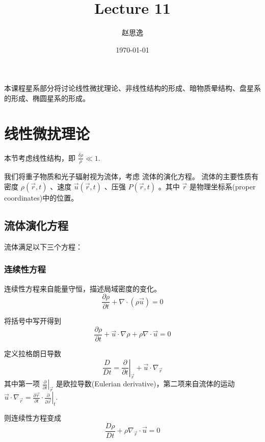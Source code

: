 \documentclass[12pt]{ctexart}
\title{Lecture 11}
\author{赵思逸}
\date{\today}
\begin{document}
\maketitle

本课程星系部分将讨论线性微扰理论、非线性结构的形成、暗物质晕结构、盘星系的形成、椭圆星系的形成。

\section{线性微扰理论}

本节考虑线性结构，即 $\frac{\delta \rho}{\rho} \ll 1$.

我们将重子物质和光子辐射视为流体，考虑
流体的演化方程。
流体的主要性质有 密度 $\rho\left(\vec{r},t\right) $ 、速度 $\vec{u}\left(\vec{r},t\right) $ 、压强 $P\left(\vec{r},t\right) $   。其中 $\vec{r}$ 是物理坐标系(proper coordinates)中的位置。

\subsection{流体演化方程}
流体满足以下三个方程： 

\subsubsection*{连续性方程}

连续性方程来自能量守恒，描述局域密度的变化。
\begin{equation}
    \frac{\partial \rho}{\partial t} + \nabla \cdot \left(\rho \vec{u}\right) = 0
\end{equation}

将括号中写开得到
\begin{equation}
    \frac{\partial \rho}{\partial t} + \vec{u}\cdot \nabla \rho + \rho \nabla \cdot \vec{u} = 0
\end{equation}

定义拉格朗日导数
\begin{equation}
    \frac{D}{D t} = \left.\frac{\partial}{\partial t} \right|_{\vec{r}} + \vec{u}\cdot \nabla_{\vec{r}}
\end{equation}
其中第一项 $\left.\frac{\partial}{\partial t} \right|_{\vec{r}}$ 是欧拉导数(Eulerian derivative)，第二项来自流体的运动 $\vec{u}\cdot \nabla_{\vec{r}} = \frac{\partial \vec{r}}{\partial t} \cdot \left.\frac{\partial}{\partial \vec{r}}\right|_t$.

则连续性方程变成
\begin{equation} \label{eq:continu}
    \frac{D \rho}{D t} + \rho \nabla_{\vec{r}} \cdot \vec{u} = 0
\end{equation}
\end{document}
